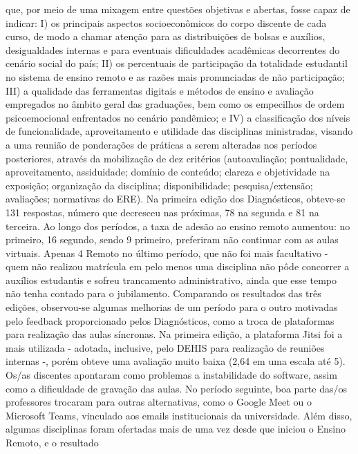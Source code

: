 que, por meio de uma mixagem entre questões objetivas e abertas, fosse capaz de indicar: I) os
principais aspectos socioeconômicos do corpo discente de cada curso, de modo a chamar atenção
para as distribuições de bolsas e auxílios, desigualdades internas e para eventuais dificuldades
acadêmicas decorrentes do cenário social do país; II) os percentuais de participação da totalidade
estudantil no sistema de ensino remoto e as razões mais pronunciadas de não participação; III) a
qualidade das ferramentas digitais e métodos de ensino e avaliação empregados no âmbito geral
das graduações, bem como os empecilhos de ordem psicoemocional enfrentados no cenário
pandêmico; e IV) a classificação dos níveis de funcionalidade, aproveitamento e utilidade das
disciplinas ministradas, visando a uma reunião de ponderações de práticas a serem alteradas nos
períodos posteriores, através da mobilização de dez critérios (autoavaliação; pontualidade,
aproveitamento, assiduidade; domínio de conteúdo; clareza e objetividade na exposição;
organização da disciplina; disponibilidade; pesquisa/extensão; avaliações; normativas do ERE).
Na primeira edição dos Diagnósticos, obteve-se 131 respostas, número que decresceu nas
próximas, 78 na segunda e 81 na terceira. Ao longo dos períodos, a taxa de adesão ao ensino
remoto aumentou: no primeiro, 16%
segundo, sendo 9%
primeiro, preferiram não continuar com as aulas virtuais. Apenas 4%
Remoto no último período, que não foi mais facultativo - quem não realizou matrícula em pelo
menos uma disciplina não pôde concorrer a auxílios estudantis e sofreu trancamento
administrativo, ainda que esse tempo não tenha contado para o jubilamento. Comparando os
resultados das três edições, observou-se algumas melhorias de um período para o outro
motivadas pelo feedback proporcionado pelos Diagnósticos, como a troca de plataformas para
realização das aulas síncronas. Na primeira edição, a plataforma Jitsi foi a mais utilizada -
adotada, inclusive, pelo DEHIS para realização de reuniões internas -, porém obteve uma
avaliação muito baixa (2,64 em uma escala até 5). Os/as discentes apontaram como problemas a
instabilidade do software, assim como a dificuldade de gravação das aulas. No período seguinte,
boa parte das/os professores trocaram para outras alternativas, como o Google Meet ou o
Microsoft Teams, vinculado aos emails institucionais da universidade. Além disso, algumas
disciplinas foram ofertadas mais de uma vez desde que iniciou o Ensino Remoto, e o resultado

